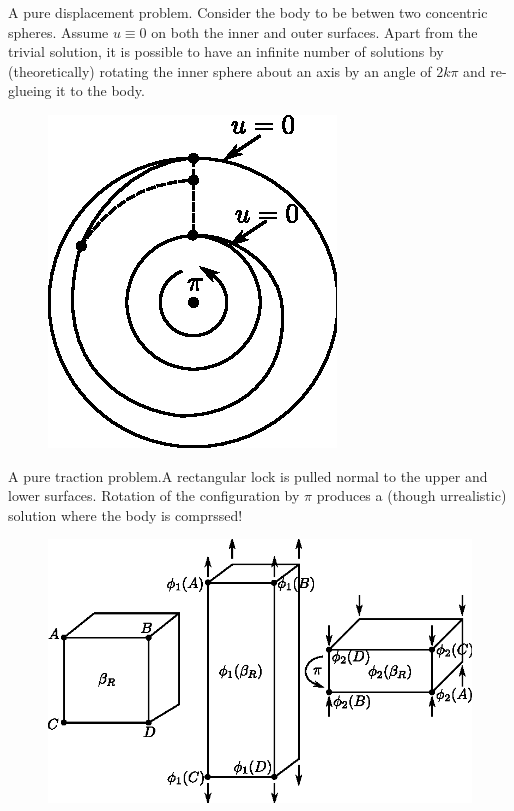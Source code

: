 \begin{example}[F.~JHON]\label{chap2-exam2.1.2} %
   A pure displacement problem. Consider the body to be
  betwen two concentric spheres. Assume $u \equiv 0$ on both the inner
  and outer surfaces. Apart from the trivial solution, it is possible
  to have an infinite number of solutions by (theoretically) rotating
  the inner sphere about an axis by an angle of $2 k \pi$ and
  re-glueing it to the body.  
\begin{figure}[H]
\centering
\includegraphics{vol71-figures/fig2.1-4.eps}
\medskip
\caption{}\label{fig2.1.4}
\end{figure}\pageoriginale
\end{example}

\begin{example}[C. ERICKSEN]\label{chap2-exam2.1.3}%
   A pure traction problem.A rectangular lock is pulled
  normal to the upper and lower surfaces. Rotation of the
  configuration by $\pi$ produces a (though urrealistic) solution
  where the body is comprssed! 
\begin{figure}[H]
\centering
\includegraphics{vol71-figures/fig2.1-5.eps}
\medskip
\caption{}\label{fig2.1.5}
\end{figure}
\end{example}

